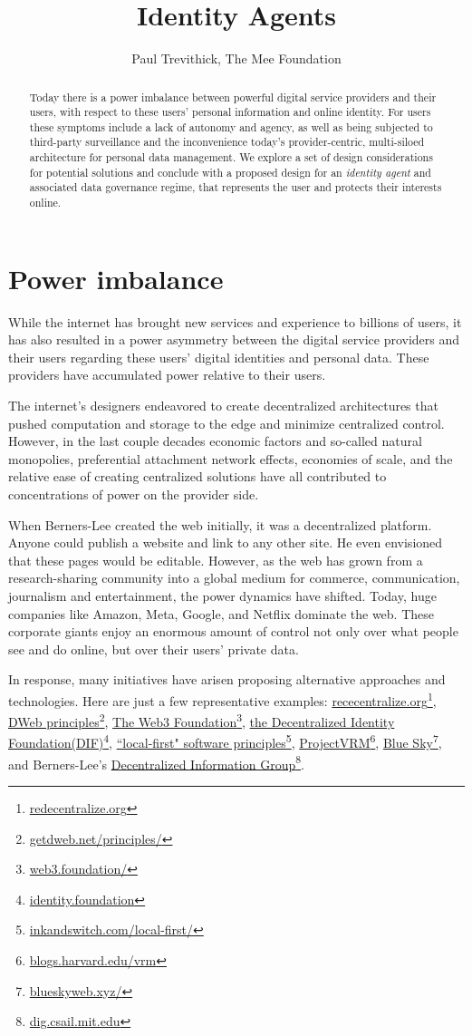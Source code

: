 \documentclass[11pt, oneside]{article}   	%
\title{Identity Agents}
\author{Paul Trevithick, The Mee Foundation}
\newcommand{\hyperfootnote}[1][]{\def\ArgI{{#1}}\hyperfootnoteRelay}
\newcommand\hyperfootnoteRelay[2][]{\href{#1#2}{\ArgI}\footnote{\href{#1#2}{#2}}}
\begin{document}
\maketitle
\begin{abstract}
Today there is a power imbalance between powerful digital service providers and their users, with respect to these users' personal information and online identity. For users these symptoms include a lack of autonomy and agency, as well as being subjected to third-party surveillance and the inconvenience today's provider-centric, multi-siloed architecture for personal data management. We explore a set of design considerations for potential solutions and conclude with a proposed design for an \emph{identity agent} and associated data governance regime, that represents the user and protects their interests online.
\end{abstract}

\section{Power imbalance}
While the internet has brought new services and experience to billions of users, it has also resulted in a power asymmetry between the digital service providers and their users regarding these users' digital identities and personal data. These providers have accumulated power relative to their users.

The internet's designers endeavored to create decentralized architectures that pushed computation and storage to the edge and minimize centralized control. However, in the last couple decades economic factors and so-called natural monopolies, preferential attachment network effects, economies of scale, and the relative ease of creating centralized solutions have all contributed to concentrations of power on the provider side. 

When Berners-Lee created the web initially, it was a decentralized platform. Anyone could publish a website and link to any other site. He even envisioned that these pages would be editable. However, as the web has grown from a research-sharing community into a global medium for commerce, communication, journalism and entertainment, the power dynamics have shifted. Today, huge companies like Amazon, Meta, Google, and Netflix dominate the web. These corporate giants enjoy an enormous amount of control not only over what people see and do online, but over their users' private data.\cite{Finley2017}

In response, many initiatives have arisen proposing alternative approaches and technologies. Here are just a few representative examples: \hyperfootnote[rececentralize.org][https://]{redecentralize.org}, \hyperfootnote[DWeb principles][https://]{getdweb.net/principles/}, \hyperfootnote[The Web3 Foundation][https://]{web3.foundation/}, \hyperfootnote[the Decentralized Identity Foundation(DIF)][https://]{identity.foundation}, \hyperfootnote[``local-first" software principles][https://]{inkandswitch.com/local-first/}, \hyperfootnote[ProjectVRM][https://]{blogs.harvard.edu/vrm}, \hyperfootnote[Blue Sky][https://]{blueskyweb.xyz/}, and Berners-Lee's \hyperfootnote[Decentralized Information Group][https://]{dig.csail.mit.edu}. 
\end{document}
